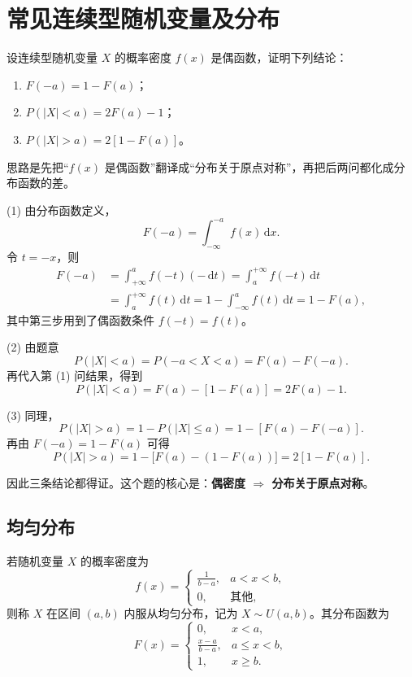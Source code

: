﻿\documentclass[lang=cn,11pt]{elegantbook}
\begin{document}
\section{常见连续型随机变量及分布}


\begin{exercise}[偶函数概率密度的性质证明] \label{exer:2-48}
设连续型随机变量 $X$ 的概率密度 $f(x)$ 是偶函数，证明下列结论：
\begin{enumerate}
    \item $F(-a)=1-F(a)$；
    \item $P(|X|<a)=2F(a)-1$；
    \item $P(|X|>a)=2[1-F(a)]$。
\end{enumerate}
\end{exercise}
\begin{solution}
思路是先把“$f(x)$ 是偶函数”翻译成“分布关于原点对称”，再把后两问都化成分布函数的差。

(1) 由分布函数定义，
\[
F(-a)=\int_{-\infty}^{-a}f(x)\,\mathrm{d}x.
\]
令 $t=-x$，则
\[
\begin{aligned}
F(-a)
&=\int_{+\infty}^{a}f(-t)(-\,\mathrm{d}t)
=\int_{a}^{+\infty}f(-t)\,\mathrm{d}t \\
&=\int_{a}^{+\infty}f(t)\,\mathrm{d}t
=1-\int_{-\infty}^{a}f(t)\,\mathrm{d}t
=1-F(a),
\end{aligned}
\]
其中第三步用到了偶函数条件 $f(-t)=f(t)$。

(2) 由题意
\[
P(|X|<a)=P(-a<X<a)=F(a)-F(-a).
\]
再代入第 (1) 问结果，得到
\[
P(|X|<a)=F(a)-[1-F(a)]=2F(a)-1.
\]

(3) 同理，
\[
P(|X|>a)=1-P(|X|\leqslant a)=1-[F(a)-F(-a)].
\]
再由 $F(-a)=1-F(a)$ 可得
\[
P(|X|>a)=1-\bigl[F(a)-(1-F(a))\bigr]=2[1-F(a)].
\]

因此三条结论都得证。这个题的核心是：\textbf{偶密度 $\Rightarrow$ 分布关于原点对称}。
\end{solution}

\subsection{均匀分布} \label{subsec:uniform-dist}
\begin{definition}[均匀分布]\label{def:uniform-dist}
若随机变量 $X$ 的概率密度为
\[
f(x) = \begin{cases}
\frac{1}{b-a}, & a < x < b, \\
0, & \text{其他},
\end{cases}
\]
则称 $X$ 在区间 $(a,b)$ 内服从均匀分布，记为 $X \sim U(a,b)$。其分布函数为
\[
F(x) = \begin{cases}
0, & x < a, \\
\frac{x-a}{b-a}, & a \le x < b, \\
1, & x \ge b.
\end{cases}
\]
\end{definition}
\end{document}
